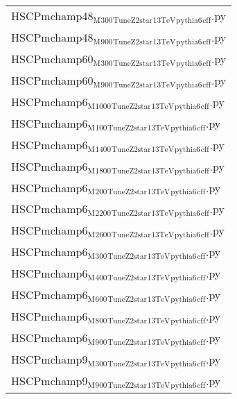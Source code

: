 \documentclass[11pt]{article}
\begin{document}
\begin{enumerate}
\begin{enumerate}
\begin{center}
\begin{tabular}{l}
HSCPmchamp48$_{\text{M}}$$_{\text{300}}$$_{\text{TuneZ2star}}$$_{\text{13TeV}}$$_{\text{pythia6}}$$_{\text{cff}}$.py\\
HSCPmchamp48$_{\text{M}}$$_{\text{900}}$$_{\text{TuneZ2star}}$$_{\text{13TeV}}$$_{\text{pythia6}}$$_{\text{cff}}$.py\\
HSCPmchamp60$_{\text{M}}$$_{\text{300}}$$_{\text{TuneZ2star}}$$_{\text{13TeV}}$$_{\text{pythia6}}$$_{\text{cff}}$.py\\
HSCPmchamp60$_{\text{M}}$$_{\text{900}}$$_{\text{TuneZ2star}}$$_{\text{13TeV}}$$_{\text{pythia6}}$$_{\text{cff}}$.py\\
HSCPmchamp6$_{\text{M}}$$_{\text{1000}}$$_{\text{TuneZ2star}}$$_{\text{13TeV}}$$_{\text{pythia6}}$$_{\text{cff}}$.py\\
HSCPmchamp6$_{\text{M}}$$_{\text{100}}$$_{\text{TuneZ2star}}$$_{\text{13TeV}}$$_{\text{pythia6}}$$_{\text{cff}}$.py\\
HSCPmchamp6$_{\text{M}}$$_{\text{1400}}$$_{\text{TuneZ2star}}$$_{\text{13TeV}}$$_{\text{pythia6}}$$_{\text{cff}}$.py\\
HSCPmchamp6$_{\text{M}}$$_{\text{1800}}$$_{\text{TuneZ2star}}$$_{\text{13TeV}}$$_{\text{pythia6}}$$_{\text{cff}}$.py\\
HSCPmchamp6$_{\text{M}}$$_{\text{200}}$$_{\text{TuneZ2star}}$$_{\text{13TeV}}$$_{\text{pythia6}}$$_{\text{cff}}$.py\\
HSCPmchamp6$_{\text{M}}$$_{\text{2200}}$$_{\text{TuneZ2star}}$$_{\text{13TeV}}$$_{\text{pythia6}}$$_{\text{cff}}$.py\\
HSCPmchamp6$_{\text{M}}$$_{\text{2600}}$$_{\text{TuneZ2star}}$$_{\text{13TeV}}$$_{\text{pythia6}}$$_{\text{cff}}$.py\\
HSCPmchamp6$_{\text{M}}$$_{\text{300}}$$_{\text{TuneZ2star}}$$_{\text{13TeV}}$$_{\text{pythia6}}$$_{\text{cff}}$.py\\
HSCPmchamp6$_{\text{M}}$$_{\text{400}}$$_{\text{TuneZ2star}}$$_{\text{13TeV}}$$_{\text{pythia6}}$$_{\text{cff}}$.py\\
HSCPmchamp6$_{\text{M}}$$_{\text{600}}$$_{\text{TuneZ2star}}$$_{\text{13TeV}}$$_{\text{pythia6}}$$_{\text{cff}}$.py\\
HSCPmchamp6$_{\text{M}}$$_{\text{800}}$$_{\text{TuneZ2star}}$$_{\text{13TeV}}$$_{\text{pythia6}}$$_{\text{cff}}$.py\\
HSCPmchamp6$_{\text{M}}$$_{\text{900}}$$_{\text{TuneZ2star}}$$_{\text{13TeV}}$$_{\text{pythia6}}$$_{\text{cff}}$.py\\
HSCPmchamp9$_{\text{M}}$$_{\text{300}}$$_{\text{TuneZ2star}}$$_{\text{13TeV}}$$_{\text{pythia6}}$$_{\text{cff}}$.py\\
HSCPmchamp9$_{\text{M}}$$_{\text{900}}$$_{\text{TuneZ2star}}$$_{\text{13TeV}}$$_{\text{pythia6}}$$_{\text{cff}}$.py\\
\hline
\end{tabular}
\end{center}


\end{enumerate}
\end{enumerate}
\end{document}
